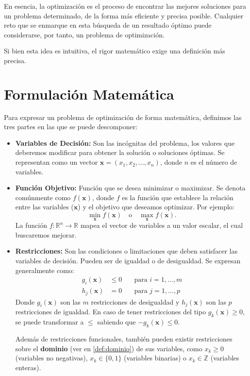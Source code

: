\documentclass[12pt,a4paper]{book}
\begin{document}
En esencia, la optimización es el proceso de encontrar las mejores soluciones para un problema determinado, de la forma más eficiente y precisa posible.
Cualquier reto que se enmarque en esta búsqueda de un resultado óptimo puede considerarse, por tanto, un problema de optimización.

Si bien esta idea es intuitiva, el rigor matemático exige una definición más precisa.

\section{Formulación Matemática}

Para expresar un problema de optimización de forma matemática, definimos las tres partes en las que se puede descomponer:

\begin{itemize}
    \item \textbf{Variables de Decisión:} Son las incógnitas del problema, los valores que deberemos modificar para obtener la solución o soluciones óptimas. Se representan como un vector $\mathbf{x} = (x_1, x_2, \ldots, x_n)$, donde $n$ es el número de variables.

    \item \textbf{Función Objetivo:} Función que se desea minimizar o maximizar.
    Se denota comúnmente como $f(\mathbf{x})$, donde $f$ es la función que establece la relación entre las variables ($\mathbf{x}$) y el objetivo que deseamos optimizar.
    Por ejemplo:
    $$ \min_{\mathbf{x}} f(\mathbf{x}) \quad \text{o} \quad \max_{\mathbf{x}} f(\mathbf{x}) .$$
    La función $f: \mathbb{R}^n \to \mathbb{R}$ mapea el vector de variables a un valor escalar, el cual buscaremos mejorar.

    \item \textbf{Restricciones:} Son las condiciones o limitaciones que deben satisfacer las variables de decisión. Pueden ser de igualdad o de desigualdad. Se expresan generalmente como:
    \begin{align*}
        g_i(\mathbf{x}) &\le 0 & \quad \text{para } i = 1, \ldots, m \\
        h_j(\mathbf{x}) &= 0 & \quad \text{para } j = 1, \ldots, p
    \end{align*}
    Donde $g_i(\mathbf{x})$ son las $m$ restricciones de desigualdad y $h_j(\mathbf{x})$ son las $p$ restricciones de igualdad.
    En caso de tener restricciones del tipo $g_k(\mathbf{x})\geq0$, se puede transformar a $\leq$ sabiendo que $-g_k(\mathbf{x}) \leq 0$.
    
    Además de restricciones funcionales, también pueden existir restricciones sobre el \textbf{dominio} (ver en \ref{def:dominio}) de sus variables, como $x_k \ge 0$ (variables no negativas),  $x_k \in \{0,1\}$ (variables binarias) o $x_k \in \mathbb{Z}$ (variables enteras).
\end{itemize}
\end{document}
